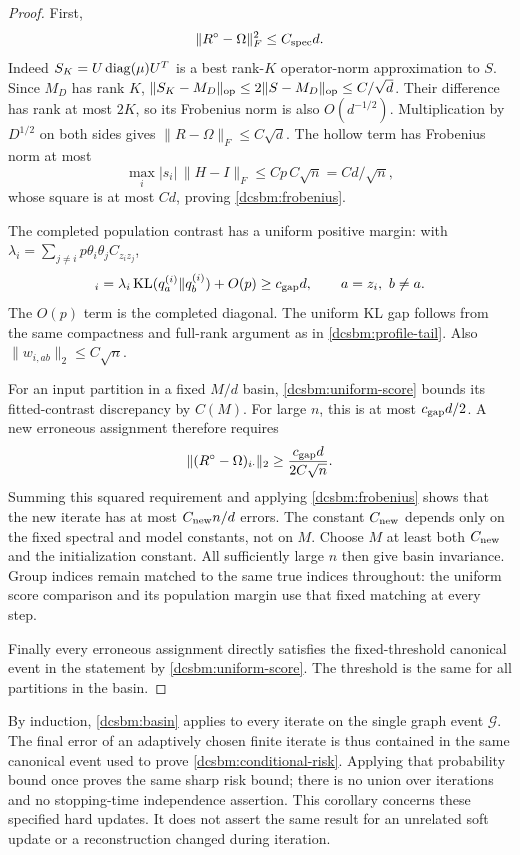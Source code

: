 \begin{proof}
First,
\begin{equation}
 \|R^\circ-\Omega\|_F^2\le C_{\rm spec}d.
 \label{dcsbm:frobenius}
\end{equation}
Indeed \(S_K=U\operatorname{diag}(\mu)U^T\) is a best rank-\(K\)
operator-norm approximation to \(S\).  Since \(M_D\) has rank
\(K\), \(\|S_K-M_D\|_{\mathrm{op}}\le2\|S-M_D\|_{\mathrm{op}}\le C/\sqrt d\).
Their difference has rank at most \(2K\), so its Frobenius norm
is also \(O(d^{-1/2})\).  Multiplication by \(D^{1/2}\) on both
sides gives \(\|R-\Omega\|_F\le C\sqrt d\).
The hollow term has Frobenius norm at most
\[
 \max_i|s_i|\,\|H-I\|_F\le Cp\,C\sqrt n=Cd/\sqrt n,
\]
whose square is at most \(Cd\), proving
\cref{dcsbm:frobenius}.

The completed population contrast has a uniform positive margin:
with \(\lambda_i=\sum_{j\ne i}p\theta_i\theta_jC_{z_i z_j}\),
\begin{equation}
 [\Omega w_{i,ab}]_i
 =\lambda_i\KL(q_a^{(i)}\|q_b^{(i)})+O(p)
 \ge c_{\rm gap}d,\qquad a=z_i,\ b\ne a.
 \label{dcsbm:population-margin}
\end{equation}
The \(O(p)\) term is the completed diagonal.  The uniform KL
gap follows from the same compactness and full-rank argument as
in \cref{dcsbm:profile-tail}.  Also
\(\|w_{i,ab}\|_2\le C\sqrt n\).

For an input partition in a fixed \(M/d\) basin,
\cref{dcsbm:uniform-score} bounds its fitted-contrast discrepancy
by \(C(M)\).  For large \(n\), this is at most
\(c_{\rm gap}d/2\).  A new erroneous assignment therefore requires
\[
 \|(R^\circ-\Omega)_{i\cdot}\|_2
 \ge \frac{c_{\rm gap}d}{2C\sqrt n}.
\]
Summing this squared requirement and applying
\cref{dcsbm:frobenius} shows that the new iterate has at most
\(C_{\rm new}n/d\) errors.  The constant \(C_{\rm new}\) depends
only on the fixed spectral and model constants, not on \(M\).
Choose \(M\) at least both \(C_{\rm new}\) and the initialization
constant.  All sufficiently large \(n\) then give basin invariance.
Group indices remain matched to the same true indices throughout:
the uniform score comparison and its population margin use that
fixed matching at every step.

Finally every erroneous assignment directly satisfies the
fixed-threshold canonical event in the statement by
\cref{dcsbm:uniform-score}.  The threshold is the same for all
partitions in the basin.
\end{proof}

By induction, \cref{dcsbm:basin} applies to every iterate on the
single graph event \(\mathcal G\).  The final error of an adaptively
chosen finite iterate is thus contained in the same canonical
event used to prove \cref{dcsbm:conditional-risk}.
Applying that probability bound once proves the same sharp risk
bound; there is no union over iterations and no stopping-time
independence assertion.  This corollary concerns these specified
hard updates.  It does not assert the same result for an unrelated
soft update or a reconstruction changed during iteration.


